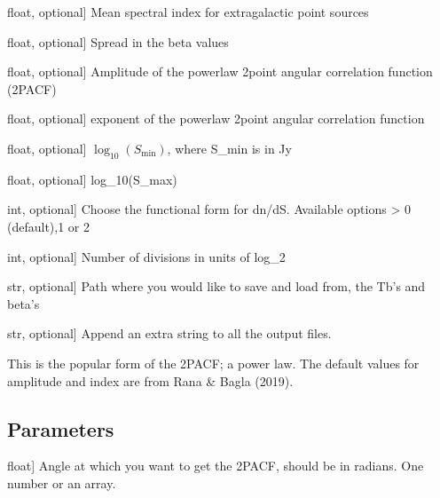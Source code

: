 \documentclass[letterpaper,10pt,english]{sphinxmanual}
\begin{document}
\begin{fulllineitems}
\begin{description}
\sphinxlineitem{beta\_o}{[}float, optional{]}
\sphinxAtStartPar
Mean spectral index for extragalactic point sources

\sphinxlineitem{sigma\_beta}{[}float, optional{]}
\sphinxAtStartPar
Spread in the beta values

\sphinxlineitem{amp}{[}float, optional{]}
\sphinxAtStartPar
Amplitude of the power\sphinxhyphen{}law 2\sphinxhyphen{}point angular correlation function (2PACF)

\sphinxlineitem{gam}{[}float, optional{]}
\sphinxAtStartPar
\sphinxhyphen{}exponent of the power\sphinxhyphen{}law 2\sphinxhyphen{}point angular correlation function

\sphinxlineitem{logSmin}{[}float, optional{]}
\sphinxAtStartPar
\(\log_{10}(S_{\mathrm{min}})\), where S\_min is in Jy

\sphinxlineitem{logSmax}{[}float, optional{]}
\sphinxAtStartPar
log\_10(S\_max)

\sphinxlineitem{dndS\_form}{[}int, optional{]}
\sphinxAtStartPar
Choose the functional form for dn/dS. Available options \sphinxhyphen{}\textgreater{} 0 (default),1 or 2

\sphinxlineitem{log2Nside}{[}int, optional{]}
\sphinxAtStartPar
Number of divisions in units of log\_2

\sphinxlineitem{path}{[}str, optional{]}
\sphinxAtStartPar
Path where you would like to save and load from, the Tb’s and beta’s

\sphinxlineitem{lbl}{[}str, optional{]}
\sphinxAtStartPar
Append an extra string to all the output files.

\end{description}

\begin{fulllineitems}
\label{\detokenize{api:furs.furs.acf}}
\pysigstartsignatures
{}
\pysigstopsignatures
\sphinxAtStartPar
This is the popular form of the 2PACF; a power law.
The default values for amplitude and index are from Rana \& Bagla (2019).


\subsection{Parameters}
\label{\detokenize{api:parameters}}\begin{description}
\sphinxlineitem{chi}{[}float{]}
\sphinxAtStartPar
Angle at which you want to get the 2PACF, should be in radians. One number or an array.


\end{description}
\end{fulllineitems}
\end{fulllineitems}
\end{document}

